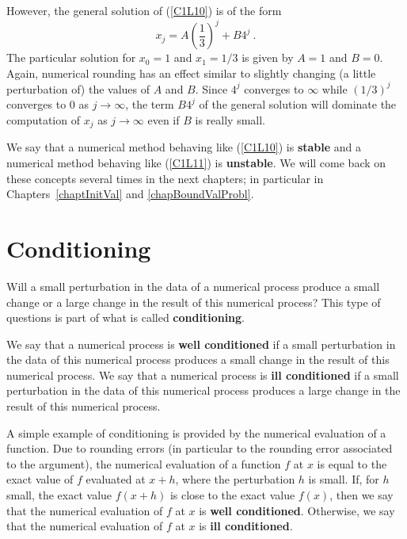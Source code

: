 However, the general solution of
(\ref{C1L10}) is of the form
\[
x_j = A \left(\frac{1}{3}\right)^j + B 4^j \ .
\]
The particular solution for $x_0=1$ and $x_1 = 1/3$ is given
by $A=1$ and $B=0$.  Again, numerical rounding has an effect similar
to slightly changing (a little perturbation of) the values of $A$ and
$B$.  Since $4^j$ converges to $\infty$ while $(1/3)^j$ converges to
$0$ as $j\rightarrow \infty$, the term $B 4^j$ of the general
solution will dominate the computation of $x_j$ as $j\rightarrow
\infty$ even if $B$ is really small.

We say that a numerical method behaving like (\ref{C1L10})
is {\bfseries stable} and a numerical
method behaving like (\ref{C1L11}) is
{\bfseries unstable}.
We will come back on these concepts several times in the next
chapters; in particular in Chapters~\ref{chaptInitVal} and
\ref{chapBoundValProbl}.

\section{Conditioning}

Will a small perturbation in the data of a numerical process produce
a small change or a large change in the result of this
numerical process?  This type of questions is part of what is called
{\bfseries conditioning}.

We say that a numerical process is
{\bfseries well conditioned} if a
small perturbation in the data of this numerical process produces a
small change in the result of this numerical process.  We say that a
numerical process is
{\bfseries ill conditioned} if a small
perturbation in the data of this numerical process produces a large
change in the result of this numerical process.

A simple example of conditioning is provided by the numerical
evaluation of a function.  Due to rounding errors (in particular to the
rounding error associated to the argument), the numerical evaluation
of a function $f$ at $x$ is equal to the exact value of $f$ evaluated
at $x+h$, where the perturbation $h$ is small.  If, for $h$ small, the
exact value $f(x+h)$ is close to the exact value $f(x)$, then we say
that the numerical evaluation of $f$ at $x$ is
{\bfseries well conditioned}.  Otherwise, we
say that the numerical evaluation of $f$ at $x$ is
{\bfseries ill conditioned}.

